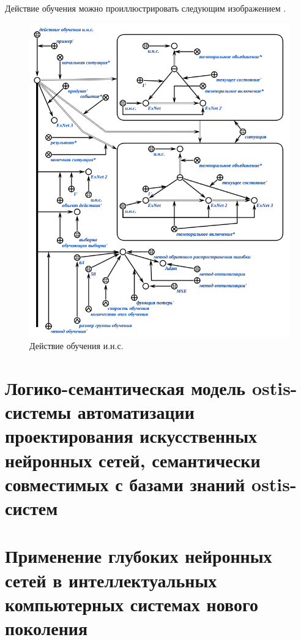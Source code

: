 Действие обучения  можно проиллюстрировать следующим изображением \textit{}.

\begin{figure}[H]
	\includegraphics[scale=0.8]{author/part3/figures/ann_training_nn_scg.png}
	\caption{Действие обучения и.н.с.}
	\label{fig:ann_training_nn_scg}
\end{figure}

\section{Логико-семантическая модель ostis-системы автоматизации проектирования искусственных нейронных сетей, семантически совместимых с базами знаний ostis-систем}



\section{Применение глубоких нейронных сетей в интеллектуальных компьютерных системах нового поколения}

